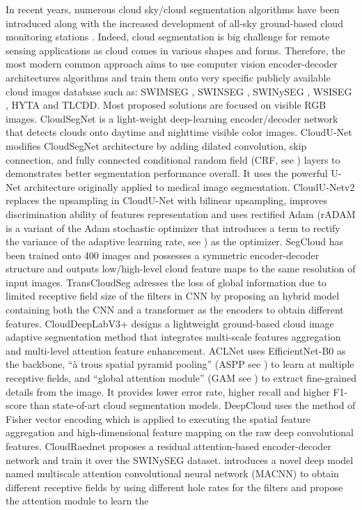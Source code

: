 \documentclass[amt, article]{copernicus}
\begin{document}
In recent years, numerous cloud sky/cloud segmentation algorithms have been introduced along with the increased development of all-sky ground-based cloud monitoring stations \citep{Long2006, Yang2012, rs12111902, ASC2, Mommert2020, amt-15-3629-2022}.
Indeed, cloud segmentation is big challenge for remote sensing applications as cloud comes in various shapes and forms. Therefore, the most modern common approach aims to use computer vision encoder-decoder architectures algorithms and train them onto very specific publicly available cloud images database such as: SWIMSEG \citep{dev2016colorbased}, SWINSEG \citep{SWINSEG, dev2017nighttime}, SWINySEG \citep{dev2019cloudsegnet}, WSISEG \citep{SegCloud}, HYTA \citep{HYTA} and TLCDD. Most proposed solutions are focused on visible RGB images. CloudSegNet \citep{dev2019cloudsegnet} is a light-weight deep-learning encoder/decoder network that detects clouds onto daytime and nighttime visible color images. CloudU-Net \citep{CloudUNet} modifies CloudSegNet architecture by adding dilated convolution, skip connection, and fully connected conditional random field (CRF, see \citet{McCallumCRF}) layers to demonstrates better segmentation performance overall. It uses the powerful U-Net architecture \citep{UNET} originally applied to medical image segmentation. CloudU-Netv2 \citep{CloudUNetv2} replaces the upsampling in CloudU-Net with bilinear upsampling, improves discrimination ability of features representation and uses rectified Adam (rADAM is a variant of the Adam \cite{ADAM} stochastic optimizer that introduces a term to rectify the variance of the adaptive learning rate, see \citealt{RADAM}) as the optimizer. SegCloud \citep{SegCloud} has been trained onto 400 images and possesses a symmetric encoder-decoder structure and outputs low/high-level cloud feature maps to the same resolution of input images. TransCloudSeg \citep{TransCloudSeg} adresses the loss of global information due to limited receptive field size of the filters in CNN by proposing an hybrid model containing both the CNN and a transformer \citep{TRANSFORMER} as the encoders to obtain different features. CloudDeepLabV3+ \citep{CloudDeepLabV3} designs a lightweight ground-based cloud image adaptive segmentation method  that integrates multi-scale fea­tures aggregation and multi-level attention feature enhancement. ACLNet \citep{makwana2022aclnet} uses EfficientNet-B0 as the backbone, “à trous spatial pyramid pooling” (ASPP see \citealt{ATROUS}) to learn at multiple receptive fields, and “global attention module” (GAM see \citealt{GAM}) to extract fine-grained details from the image. It provides lower error rate, higher recall and higher F1-score than state-of-art cloud segmentation models. DeepCloud \citep{DeepCloud} uses the method of Fisher vector encoding which is applied to executing the spatial feature aggregation and high-dimensional feature mapping on the raw deep convolutional features. CloudRaednet \citep{shi2022cloudraednet} proposes a residual attention-based encoder-decoder network and train it over the SWINySEG dataset. \citealt{MACNN} introduces a novel deep model named multiscale attention convolutional neural network (MACNN) to obtain different receptive fields by using different hole rates for the filters and propose the attention module to learn the 
\end{document}
